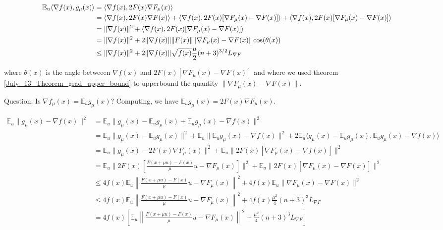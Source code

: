 \documentclass{article}
\begin{document}
\begin{align}
\mathbb{E}_u\langle \nabla f(x),g_{\mu}(x)\rangle & = \langle \nabla f(x), 2F(x)\nabla F_{\mu}(x)\rangle \notag \\ & = \langle \nabla f(x),2F(x)\nabla F(x)\rangle + \langle \nabla f(x), 2F(x)[\nabla F_{\mu}(x)-\nabla F(x)]\rangle + \langle \nabla f(x), 2F(x)[\nabla F_{\mu}(x)-\nabla F(x)]\rangle \notag \\ & = \| \nabla f(x)\|^2 + \langle \nabla f(x), 2F(x)[\nabla F_{\mu}(x)-\nabla F(x)]\rangle \notag \\ & = \| \nabla f(x)\|^2 + 2\|\nabla f(x) \| \|F(x)\| \|\nabla F_{\mu}(x)-\nabla F(x)\|\cos(\theta(x)) \notag \\ & \leq \|\nabla f(x)\|^2 + 2\|\nabla f(x)\| \sqrt{f(x)}\frac{\mu}{2}(n+3)^{3/2}L_{\nabla F} \label{August_4_equation_2}
\end{align}

where $\theta(x)$ is the angle betweeen $\nabla f(x)$ and $2F(x)[\nabla F_{\mu}(x)-\nabla F(x)]$ and where we used theorem \ref{July_13_Theorem_grad_upper_bound} to upperbound the quantity $\|\nabla F_{\mu}(x) - \nabla F(x)\|$. \newline 

Question: Is $\nabla f_{\mu}(x) = \mathbb{E}_ug_{\mu}(x)$? Computing, we have $\mathbb{E}_ug_{\mu}(x) = 2F(x)\nabla F_{\mu}(x)$.  \newline 

\begin{align*}
\mathbb{E}_u\|g_{\mu}(x) - \nabla f(x)\|^2 & = \mathbb{E}_u\|g_{\mu}(x) - \mathbb{E}_ug_{\mu}(x) + \mathbb{E}_ug_{\mu}(x) - \nabla f(x)\|^2 \\ & = \mathbb{E}_u\|g_{\mu}(x) - \mathbb{E}_ug_{\mu}(x)\|^2 + \mathbb{E}_u\|\mathbb{E}_ug_{\mu}(x) - \nabla f(x)\|^2 + 2\mathbb{E}_u\langle g_{\mu}(x) - \mathbb{E}_ug_{\mu}(x),\mathbb{E}_ug_{\mu}(x)-\nabla f(x)\rangle \\ & = \mathbb{E}_u\|g_{\mu}(x) - 2F(x)\nabla F_{\mu}(x)\|^2 + \mathbb{E}_u\|2F(x)[\nabla F_{\mu}(x) - \nabla f(x)]\|^2  \\ & = \mathbb{E}_u\|2F(x)\left[\frac{F(x+\mu u)-F(x)}{\mu}u - \nabla F_{\mu}(x)\right]\|^2 + \mathbb{E}_u\|2F(x)\left[\nabla F_{\mu}(x) - \nabla F(x)\right]\|^2 \\ & \leq 4f(x)\mathbb{E}_u\left\| \frac{F(x+\mu u) - F(x)}{\mu}u - \nabla F_{\mu}(x) \right\|^2 + 4f(x)\mathbb{E}_u\|\nabla F_{\mu}(x) - \nabla F(x)\|^2 \\ & \leq 4f(x)\mathbb{E}_u\left\| \frac{F(x+\mu u) - F(x)}{\mu}u - \nabla F_{\mu}(x) \right\|^2 + 4f(x)\frac{\mu^2}{4}(n+3)^3L_{\nabla F} \\ & = 4f(x)\left[\mathbb{E}_u\left\| \frac{F(x+\mu u) - F(x)}{\mu}u - \nabla F_{\mu}(x) \right\|^2 + \frac{\mu^2}{4}(n+3)^3L_{\nabla F}\right]
\end{align*}
\end{document}
